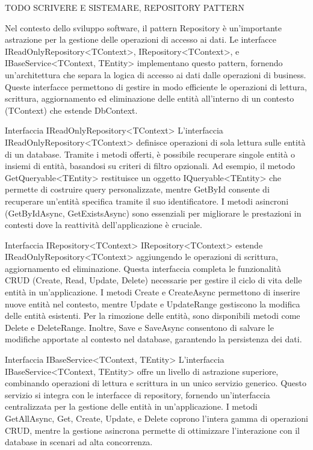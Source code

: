                         TODO SCRIVERE E SISTEMARE, REPOSITORY PATTERN 

Nel contesto dello sviluppo software, il pattern Repository è un'importante astrazione per la gestione delle operazioni di accesso ai dati. Le interfacce IReadOnlyRepository<TContext>, IRepository<TContext>, e IBaseService<TContext, TEntity> implementano questo pattern, fornendo un'architettura che separa la logica di accesso ai dati dalle operazioni di business. Queste interfacce permettono di gestire in modo efficiente le operazioni di lettura, scrittura, aggiornamento ed eliminazione delle entità all'interno di un contesto (TContext) che estende DbContext.

Interfaccia IReadOnlyRepository<TContext>
L'interfaccia IReadOnlyRepository<TContext> definisce operazioni di sola lettura sulle entità di un database. Tramite i metodi offerti, è possibile recuperare singole entità o insiemi di entità, basandosi su criteri di filtro opzionali. Ad esempio, il metodo GetQueryable<TEntity> restituisce un oggetto IQueryable<TEntity> che permette di costruire query personalizzate, mentre GetById consente di recuperare un'entità specifica tramite il suo identificatore. I metodi asincroni (GetByIdAsync, GetExistsAsync) sono essenziali per migliorare le prestazioni in contesti dove la reattività dell'applicazione è cruciale.

Interfaccia IRepository<TContext>
IRepository<TContext> estende IReadOnlyRepository<TContext> aggiungendo le operazioni di scrittura, aggiornamento ed eliminazione. Questa interfaccia completa le funzionalità CRUD (Create, Read, Update, Delete) necessarie per gestire il ciclo di vita delle entità in un'applicazione. I metodi Create e CreateAsync permettono di inserire nuove entità nel contesto, mentre Update e UpdateRange gestiscono la modifica delle entità esistenti. Per la rimozione delle entità, sono disponibili metodi come Delete e DeleteRange. Inoltre, Save e SaveAsync consentono di salvare le modifiche apportate al contesto nel database, garantendo la persistenza dei dati.

Interfaccia IBaseService<TContext, TEntity>
L'interfaccia IBaseService<TContext, TEntity> offre un livello di astrazione superiore, combinando operazioni di lettura e scrittura in un unico servizio generico. Questo servizio si integra con le interfacce di repository, fornendo un'interfaccia centralizzata per la gestione delle entità in un'applicazione. I metodi GetAllAsync, Get, Create, Update, e Delete coprono l'intera gamma di operazioni CRUD, mentre la gestione asincrona permette di ottimizzare l'interazione con il database in scenari ad alta concorrenza.

